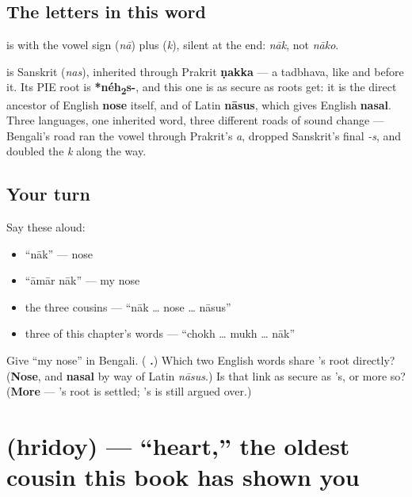 \subsection*{The letters in this word}
\textbf{} is \textbf{} with the vowel sign \textbf{} (\emph{nā}) plus \textbf{} (\emph{k}), silent at the end: \emph{nāk}, not \emph{nāko}.

\begin{cousinweb}
\textbf{} is Sanskrit \textbf{} (\emph{nas}), inherited through Prakrit \textbf{ṇakka} — a tadbhava, like  and  before it. Its PIE root is \textbf{*néh\textsubscript{2}s-}, and this one is as secure as roots get: it is the direct ancestor of English \textbf{nose} itself, and of Latin \textbf{nāsus}, which gives English \textbf{nasal}. Three languages, one inherited word, three different roads of sound change — Bengali's road ran the vowel through Prakrit's \emph{a}, dropped Sanskrit's final \emph{-s}, and doubled the \emph{k} along the way.
\end{cousinweb}

\subsection*{Your turn}
Say these aloud:

\begin{itemize}
\raggedright
  \item \textquotedblleft{}nāk\textquotedblright{} — nose
  \item \textquotedblleft{}āmār nāk\textquotedblright{} — my nose
  \item the three cousins — \textquotedblleft{}nāk … nose … nāsus\textquotedblright{}
  \item three of this chapter's words — \textquotedblleft{}chokh … mukh … nāk\textquotedblright{}
\end{itemize}

\begin{tcolorbox}[breakable,colback=teal!4,colframe=teal!35!black,title={Before you move on}]
Give \textquotedblleft{}my nose\textquotedblright{} in Bengali. (\textbf{ .}) Which two English words share 's root directly? (\textbf{Nose}, and \textbf{nasal} by way of Latin \emph{nāsus}.) Is that link as secure as 's, or more so? (\textbf{More} — 's root is settled; 's is still argued over.)
\end{tcolorbox}
\section[hridoy]{ (hridoy) — \textquotedblleft{}heart,\textquotedblright{} the oldest cousin this book has shown you}

